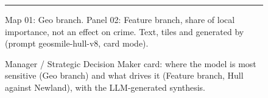 \begin{figure}[!htbp]
\begin{tcolorbox}
\begin{minipage}[t]{0.485\linewidth}\vspace{0pt}
  \par\vspace{2pt}
  \cardSecB\par
\end{minipage}\par\vspace{4pt}
{\color{cardRule}\rule{\linewidth}{0.4pt}}\par\vspace{1pt}
{\color{cardMuted}\footnotesize \cardFooter{} Map 01: Geo branch. Panel 02: Feature branch, share of
local importance, not an effect on crime. Text, tiles and  generated by \cardModel{}
(prompt geosmile-hull-v8, card mode).\par}
\end{tcolorbox}
\caption{Manager / Strategic Decision Maker card: where the model is most sensitive (Geo branch)
and what drives it (Feature branch, Hull against Newland), with the LLM-generated synthesis.}
\label{fig:stakeholder-manager}
\end{figure}
